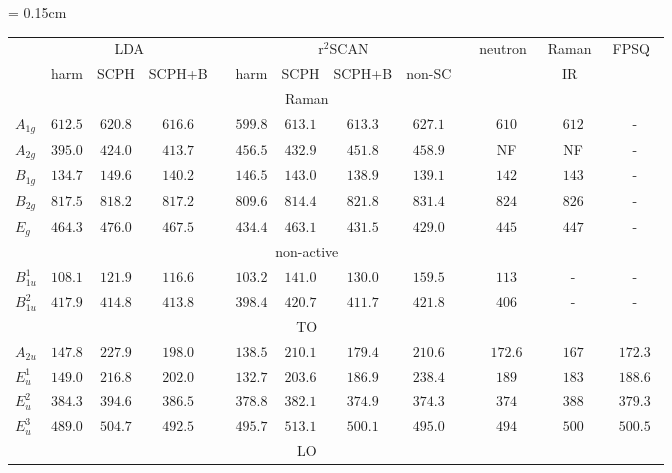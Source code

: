 \documentclass[multi=tabular]{standalone}
\begin{document}
\begin{threeparttable}
 \centering
 \renewcommand{\arraystretch}{1.5}
{\tabcolsep = 0.15cm
  \begin{tabular}{lcccccccccccc}
   \hline\hline
    & \multicolumn{3}{c}{LDA} & &\multicolumn{4}{c}{$\mathrm{r}^2$SCAN} && neutron~\cite{traylor1971Lattice} & Raman~\cite{porto1967raman}  & FPSQ~\cite{schoche2013Infrared} \\ \cline{2-4}\cline{6-9}
    & harm & SCPH & SCPH+B && harm & SCPH & SCPH+B & non-SC &&  &IR~\cite{eagles1964Polar} &  \\
   \hline 
    \multicolumn{12}{c}{Raman} \\
   $A_{1g}$    &$612.5$ & $620.8$ & $616.6$ && $599.8$ & $613.1$ & $613.3$ & $627.1$ && $610$    & $612$ & -\\ 
   $A_{2g}$    &$395.0$ & $424.0$ & $413.7$ && $456.5$ & $432.9$ & $451.8$ & $458.9$ && NF\tnote{1}       & NF    & -\\ 
   $B_{1g}$    &$134.7$ & $149.6$ & $140.2$ && $146.5$ & $143.0$ & $138.9$ & $139.1$ && $142$    & $143$ & - \\ 
   $B_{2g}$    &$817.5$ & $818.2$ & $817.2$ && $809.6$ & $814.4$ & $821.8$ & $831.4$ && $824$    & $826$ & - \\ 
   $E_g$       &$464.3$ & $476.0$ & $467.5$ && $434.4$ & $463.1$ & $431.5$ & $429.0$ && $445$    & $447$ & - \\ 
    \multicolumn{12}{c}{non-active} \\
   $B^1_{1u}$  &$108.1$ & $121.9$ & $116.6$ && $103.2$ & $141.0$ & $130.0$ & $159.5$ && $113$    &   -   & - \\
   $B^2_{1u}$  &$417.9$ & $414.8$ & $413.8$ && $398.4$ & $420.7$ & $411.7$ & $421.8$ && $406$    &   -   & - \\
    \multicolumn{12}{c}{TO} \\
   $A_{2u} $   &$147.8$ & $227.9$ & $198.0$ && $138.5$ & $210.1$ & $179.4$ & $210.6$ && $172.6$ & $167$ & $172.3$ \\
   $E^1_{u}$   &$149.0$ & $216.8$ & $202.0$ && $132.7$ & $203.6$ & $186.9$ & $238.4$ && $189$   & $183$ & $188.6$ \\ 
   $E^2_{u}$   &$384.3$ & $394.6$ & $386.5$ && $378.8$ & $382.1$ & $374.9$ & $374.3$ && $374$   & $388$ & $379.3$ \\  
   $E^3_{u}$   &$489.0$ & $504.7$ & $492.5$ && $495.7$ & $513.1$ & $500.1$ & $495.0$ && $494$   & $500$ & $500.5$ \\
    \multicolumn{12}{c}{LO} \\

\end{tabular}}
\end{threeparttable}
\end{document}
